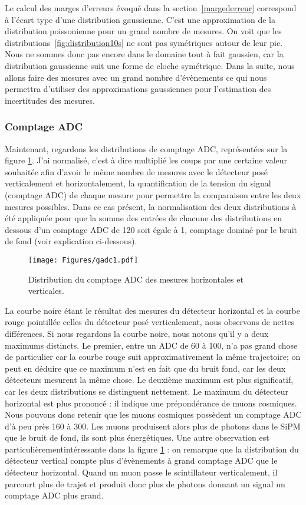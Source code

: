 \documentclass[a4paper, 12pt]{article}
\begin{document}
\begin{spacing}{1.5}
Le calcul des marges d'erreurs évoqué dans la section~\ref{margederreur} correspond à l'écart type d'une distribution gaussienne. C'est une approximation de la distribution poissonienne pour un grand nombre de mesures. On voit que les distributions~\ref{fig:distribution10s} ne sont pas symétriques autour de leur pic. Nous ne sommes donc pas encore dans le domaine tout à fait gaussien, car la distribution gaussienne suit une forme de cloche symétrique. Dans la suite, nous allons faire des mesures avec un grand nombre d'évènements ce qui nous permettra d'utiliser des approximations gaussiennes pour l'estimation des incertitudes des mesures. 

\subsubsection{Comptage ADC}
\label{sec:ADC}

Maintenant, regardons les distributions de comptage ADC, représentées sur la figure \ref{fig:gADC1}. J'ai normalisé, c'est à dire multiplié les coups par une certaine valeur souhaitée afin d'avoir le même nombre de mesures avec le détecteur posé verticalement et horizontalement, la quantification de la tension du signal (comptage ADC) de chaque mesure pour permettre la comparaison entre les deux mesures possibles. Dans ce cas présent, la normalisation des deux distributions à été appliquée pour que la somme des entrées de chacune des distributions en dessous d'un comptage ADC de 120 soit égale à 1, comptage dominé par le bruit de fond (voir explication ci-dessous).
\begin{figure}[t]
\begin{center}
  \texttt{[image: Figures/gadc1.pdf]}
  \caption{\label{fig:gADC1} Distribution du comptage ADC des mesures horizontales et verticales.}
\end{center}
\end{figure}

La courbe noire étant le résultat des mesures du détecteur horizontal et la courbe rouge pointillée celles du détecteur posé verticalement, nous observons de nettes différences. Si nous regardons la courbe noire, nous notons qu'il y a deux maximums distincts. Le premier, entre un ADC de 60 à 100, n'a pas grand chose de particulier car la courbe rouge suit approximativement la même trajectoire; on peut en déduire que ce maximum n'est en fait que du bruit fond, car les deux détecteurs mesurent la même chose. Le deuxième maximum est plus significatif, car les deux distributions se distinguent nettement. Le maximum du détecteur horizontal est plus prononcé : il indique une prépondérance de muons cosmiques. Nous pouvons donc retenir que les muons cosmiques possèdent un comptage ADC d'à peu près 160 à 300. Les muons produisent alors plus de photons dans le SiPM que le bruit de fond, ils sont plus énergétiques. Une autre observation est particulièrementintéressante dans la figure \ref{fig:gADC1} : on remarque que la distribution du détecteur vertical compte plus d'évènements à grand comptage ADC que le détecteur horizontal. Quand un muon passe le scintillateur verticalement, il parcourt plus de trajet et produit donc plus de photons donnant un signal un comptage ADC plus grand.


\end{spacing}
\end{document}

